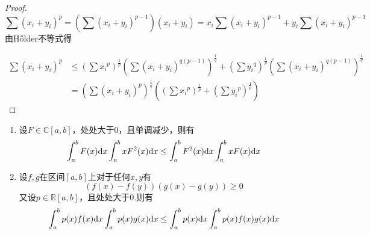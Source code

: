 \begin{proof}

    $$\sum{(x_i + y_i)}^p = \left( \sum{(x_i + y_i)}^{p-1} \right) (x_i + y_i) = x_i \sum{(x_i + y_i)}^{p-1} + y_i \sum{(x_i+ y_i)^{p-1}}$$
    由\textup{H{\H o}lder}不等式得
    
    \begin{align*}
        \sum{(x_i + y_i)}^p &\leq \left(\sum{{x_i}^p}\right)^{\frac{1}{p}} \left(\sum{(x_i + y_i)^{q(p-1)}}\right)^{\frac{1}{q}} + \left(\sum{{y_i}^q}\right)^{\frac{1}{p}} \left(\sum{(x_i + y_i)^{q(p-1)}}\right)^{\frac{1}{q}}\\
        &= \left( \sum{(x_i + y_i)}^p \right) ^{\frac{1}{q}} \left( \left(\sum{{x_i}^p}\right)^{\frac{1}{p}}  + \left(\sum{{y_i}^{p}}\right)^{\frac{1}{p}} \right)
    \end{align*}

\end{proof}

\begin{theorem}

    \begin{enumerate}
        
        \item 
            设$F\in\mathbb{C}[a,b]$，处处大于$0$，且单调减少，则有
            $$ \int_{a}^{b}{F(x)}\mathrm{d} x\int_{a}^{b}{xF^2(x)}\mathrm{d} x \leq \int_{a}^{b}{F^2(x)}\mathrm{d} x \int_{a}^{b}{xF(x)}\mathrm{d} x $$

        \item 
            设$f,g$在区间$[a,b]$上对于任何$x,y$有
            $$ (f(x)-f(y))(g(x)-g(y))\geq 0 $$
            又设$p\in\mathbb{R}[a,b]$，且处处大于$0$.则有
            $$ \int_{a}^{b}{p(x)f(x)}\mathrm{d} x\int_{a}^{b}{p(x)g(x)}\mathrm{d} x \leq \int_{a}^{b}{p(x)}\mathrm{d} x \int_{a}^{b}{p(x)f(x)g(x)}\mathrm{d} x $$

    \end{enumerate}

\end{theorem}

